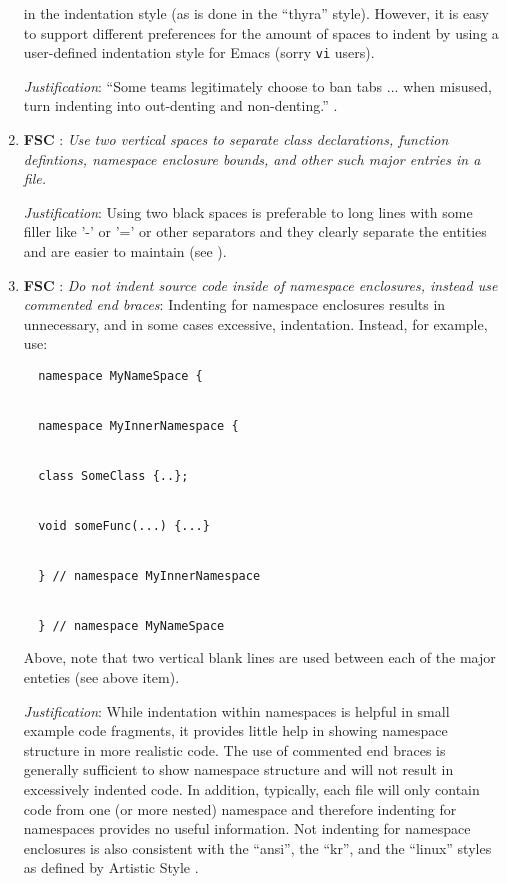 \begin{enumerate}
in the indentation style (as is done in the ``thyra'' style).  However, it is
easy to support different preferences for the amount of spaces to indent by
using a user-defined indentation style for Emacs (sorry {}\texttt{vi} users).

{}\textit{Justification}: ``Some teams legitimately choose to ban tabs
... when misused, turn indenting into out-denting and non-denting.''
{}\cite[Item 0]{C++CodingStandards05}.

{}\item{}\textbf{FSC }:
{}\textit{Use two vertical spaces to separate class declarations, function
defintions, namespace enclosure bounds, and other such major entries in a
file.}

{}\textit{Justification}: Using two black spaces is preferable to long lines
with some filler like '-' or '=' or other separators and they clearly separate
the entities and are easier to maintain (see {}\cite[Section
31.8]{CodeComplete2nd04}).

{}\item{}\textbf{FSC }:
{}\textit{Do not indent source code inside of namespace enclosures,
instead use commented end braces}: Indenting for namespace enclosures results
in unnecessary, and in some cases excessive, indentation.  Instead, for
example, use:

{\small\begin{verbatim}
  namespace MyNameSpace {


  namespace MyInnerNamespace {


  class SomeClass {..};


  void someFunc(...) {...}


  } // namespace MyInnerNamespace


  } // namespace MyNameSpace
\end{verbatim}}

Above, note that two vertical blank lines are used between each of the major
enteties (see above item).

{}\textit{Justification}: While indentation within namespaces is helpful in
small example code fragments, it provides little help in showing namespace
structure in more realistic code.  The use of commented end braces is
generally sufficient to show namespace structure and will not result in
excessively indented code.  In addition, typically, each file will only
contain code from one (or more nested) namespace and therefore indenting for
namespaces provides no useful information.  Not indenting for namespace
enclosures is also consistent with the ``ansi'', the ``kr'', and the ``linux''
styles as defined by Artistic Style {}\cite{ArtisticStyle}.


\end{enumerate}
